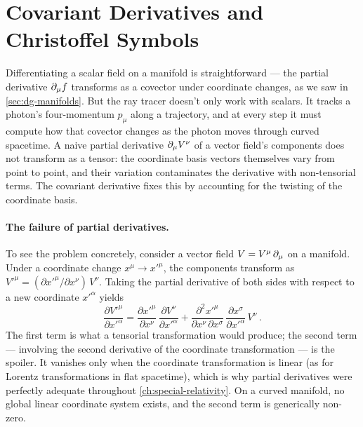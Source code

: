 \section{Covariant Derivatives and Christoffel Symbols}
\label{sec:dg-covariant}

Differentiating a scalar field on a manifold is straightforward --- the partial
derivative $\partial_{\mu} f$ transforms as a covector under coordinate changes, as
we saw in \cref{sec:dg-manifolds}.  But the ray tracer doesn't only work with
scalars.  It tracks a photon's four-momentum $p_\mu$ along a trajectory, and at
every step it must compute how that covector changes as the photon moves through
curved spacetime.  A naive partial derivative $\partial_{\mu} V^\nu$ of a vector
field's components does not transform as a tensor: the coordinate basis vectors
themselves vary from point to point, and their variation contaminates the
derivative with non-tensorial terms.  The covariant derivative fixes this by
accounting for the twisting of the coordinate basis.

\paragraph{The failure of partial derivatives.}

To see the problem concretely, consider a vector field $V = V^\mu\,\partial_{\mu}$ on
a manifold.  Under a coordinate change $x^\mu \to x'^\mu$, the components
transform as $V'^\mu = (\partial x'^\mu / \partial x^\nu)\, V^\nu$.  Taking
the partial derivative of both sides with respect to a new coordinate
$x'^\alpha$ yields
%
\begin{equation}
  \frac{\partial V'^\mu}{\partial x'^\alpha}
  = \frac{\partial x'^\mu}{\partial x^\nu}\,
    \frac{\partial V^\nu}{\partial x'^\alpha}
  + \frac{\partial^2 x'^\mu}{\partial x^\nu\,\partial x^\sigma}\,
    \frac{\partial x^\sigma}{\partial x'^\alpha}\, V^\nu \,.
  \label{eq:partial-nontensor}
\end{equation}
%
The first term is what a tensorial transformation would produce; the second term
--- involving the second derivative of the coordinate transformation --- is the
spoiler.  It vanishes only when the coordinate transformation is linear (as for
Lorentz transformations in flat spacetime), which is why partial derivatives
were perfectly adequate throughout \cref{ch:special-relativity}.  On a curved
manifold, no global linear coordinate system exists, and the second term is
generically non-zero.


